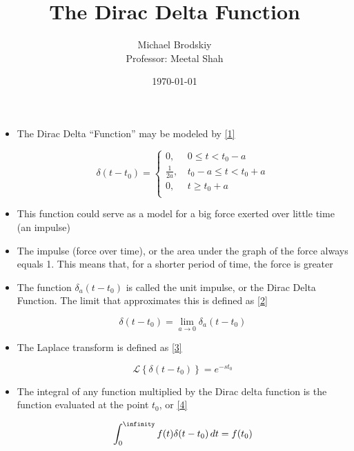 \documentclass[12pt]{article}
\title{The Dirac Delta Function}
\date{\today}
\author{Michael Brodskiy\\ \small Professor: Meetal Shah}
\begin{document}
\maketitle

\begin{itemize}

  \item The Dirac Delta ``Function'' may be modeled by \eqref{1}

    \begin{equation}
      \delta(t-t_0)=\left\{\begin{array}{ll} 0,\, & 0\leq t < t_0-a\\ \frac{1}{2a},\, & t_0-a\leq t < t_0+a\\ 0,\, & t\geq t_0 + a\\ \end{array}
      \label{1}
    \end{equation}

  \item This function could serve as a model for a big force exerted over little time (an impulse)

  \item The impulse (force over time), or the area under the graph of the force always equals 1. This means that, for a shorter period of time, the force is greater

  \item The function $\delta_a(t-t_0)$ is called the unit impulse, or the Dirac Delta Function. The limit that approximates this is defined as \eqref{2}

    \begin{equation}
      \delta (t-t_0)=\lim_{a\to0}\delta_a(t-t_0)
      \label{2}
    \end{equation}

  \item The Laplace transform is defined as \eqref{3}

    \begin{equation}
      \mathcal{L}\left\{ \delta(t-t_0) \right\}=e^{-st_0}
      \label{3}
    \end{equation}

  \item The integral of any function multiplied by the Dirac delta function is the function evaluated at the point $t_0$, or \eqref{4}

    \begin{equation}
      \int_0^{\infinity} f(t)\delta(t-t_0)\,dt=f(t_0)
      \label{4}
    \end{equation}

\end{itemize}
\end{document}
